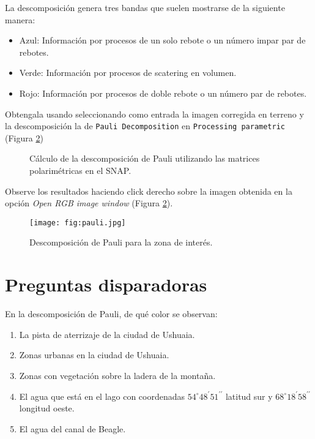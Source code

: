 La descomposición genera tres bandas que suelen mostrarse de la siguiente manera:

\begin{itemize}
    \item Azul: Información por procesos de un solo rebote o un número impar par de rebotes.
    \item Verde: Información por procesos de scatering en volumen.
    \item Rojo: Información por procesos de doble rebote o un número par de rebotes.
\end{itemize}

Obtengala usando  seleccionando como entrada la imagen corregida en terreno y la descomposición la de \texttt{Pauli Decomposition} en \texttt{Processing parametric} (Figura \ref{fig:pauli})

\begin{figure}[h!]
    \centering
    \hspace{1cm}
    \caption{Cálculo de la descomposición de Pauli utilizando las matrices polarimétricas en el SNAP.}
    \label{fig:pauli}
\end{figure}

Observe los resultados haciendo click derecho sobre la imagen obtenida en la opción \emph{Open RGB image window} (Figura \ref{fig:pauli}).

\begin{figure}[h!]
    \centering
    \texttt{[image: fig:pauli.jpg]}
    \caption{Descomposición de Pauli para la zona de interés.}
    \label{fig:pauli}
\end{figure}


\section{Preguntas disparadoras}

\begin{que}
    En la descomposición de Pauli, de qué color  se observan:
    \begin{enumerate}
        \item La pista de aterrizaje de la ciudad de Ushuaia.
        \item Zonas urbanas en la ciudad de Ushuaia.
        \item Zonas con vegetación sobre la ladera de la montaña.
        \item El agua que está en el lago con coordenadas $54^\circ 48^\prime 51^{\prime\prime}$ latitud sur y $68^\circ 18^\prime 58^{\prime\prime}$ longitud oeste.
        \item El agua del canal de Beagle.
    \end{enumerate}
\end{que}
